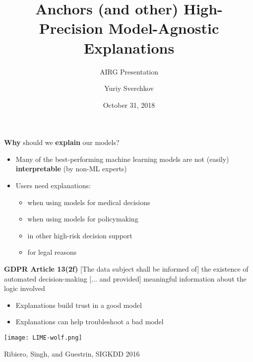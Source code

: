 \documentclass[aspectratio=169]{beamer}
\title{Anchors (and other) High-Precision Model-Agnostic Explanations}
\subtitle{AIRG Presentation}
\author{Yuriy Sverchkov}
\institute{University of Wisconsin--Madison}
\date{October 31, 2018}
\begin{document}
  {
    \begin{frame}[plain]
      \vskip4cm
      \titlepage
    \end{frame}
  }


%

\begin{frame}{\textbf{Why} should we \textbf{explain} our models?}

\begin{itemize}[<+->]
	\item Many of the best-performing machine learning models are not (easily) \textbf{interpretable} (by non-ML experts)
	\item Users need explanations:
	\begin{itemize}
		\item when using models for medical decisions
		\item when using models for policymaking
		\item in other high-risk decision support
		\item for legal reasons
	\end{itemize}
\end{itemize}
\pause

\textbf{GDPR Article 13(2f)} [The data subject shall be informed of] the existence of automated decision-making [... and provided] meaningful information about the logic involved

\begin{itemize}[<+->]
	\item Explanations build trust in a good model
	\item Explanations can help troubleshoot a bad model
\end{itemize}
\end{frame}


\begin{frame}
\vfill

\centering
\texttt{[image: LIME-wolf.png]}

\vfill

\raggedleft
\scriptsize
Ribiero, Singh, and Guestrin, SIGKDD 2016
\end{frame}
\end{document}
